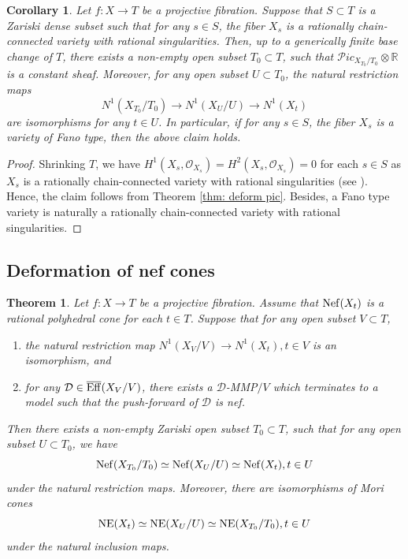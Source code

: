 \documentclass[11pt,oneside,reqno]{amsart}
\numberwithin{equation}{section}
\newtheorem{theorem}[proposition]{Theorem}
\newtheorem{corollary}[proposition]{Corollary}
\theoremstyle{definition}
\newcommand{\Nef}{{\rm {Nef}}}
\newcommand{\NE}{{\rm {NE}}}
\newcommand{\bEff}{\overline{\rm {Eff}}}
\newcommand{\bR}{\mathbb{R}}
\newcommand{\mD}{\mathcal{D}}
\newcommand{\mO}{\mathcal{O}}
\newcommand{\mP}{\mathcal{P}}
\begin{document}
\begin{corollary}\label{cor: FT and rationally connected}
Let $f: X \to T$ be a projective fibration. Suppose that $S\subset T$ is a Zariski dense subset such that for any $s\in S$, the fiber $X_s$ is a rationally chain-connected variety with rational singularities. Then, up to a generically finite base change of $T$, there  exists a non-empty open subset $T_0\subset T$, such that ${\mP}ic_{X_{T_0}/T_0} \otimes \bR$ is a constant sheaf. Moreover, for any open subset $U\subset T_0$, the natural restriction maps
\[
N^1(X_{T_0}/T_0) \to N^1(X_U/U) \to N^1(X_t)
\] are isomorphisms for any $t\in U$. In particular, if for any $s\in S$, the fiber $X_s$ is a variety of Fano type, then the above claim holds. 
\end{corollary}
\begin{proof}
Shrinking $T$, we have $H^1(X_s, \mO_{X_s})=H^2(X_s, \mO_{X_s})=0$ for each $s\in S$ as $X_s$ is a rationally chain-connected variety with rational singularities (see \cite[IV, Theorem 3.10, Corollary 3.8]{Kol96}). Hence, the claim follows from Theorem \ref{thm: deform pic}. Besides, a Fano type variety is naturally a rationally chain-connected variety with rational singularities.
\end{proof}




\subsection{Deformation of nef cones}\label{subsec: nef cone}


\begin{theorem}\label{thm: nef cone}
Let $f: X \to T$ be a projective fibration. Assume that $\Nef(X_t)$ is a rational polyhedral cone for each $t\in T$. Suppose that for any open subset $V\subset T$, 
\begin{enumerate}
\item the natural restriction map $N^1(X_V/V) \to N^1(X_t), t\in V$ is an isomorphism, and
\item for any $\mD \in \bEff(X_V/V)$, there exists a $\mD$-MMP$/V$ which terminates to a model such that the push-forward of $\mD$ is nef.
\end{enumerate}
Then there exists a non-empty Zariski open subset $T_0\subset T$, such that for any open subset $U\subset T_0$, we have
\[
\Nef(X_{T_0}/T_0) \simeq \Nef(X_U/U) \simeq \Nef(X_t), t\in U
\] under the natural restriction maps. Moreover, there are isomorphisms of Mori cones
\[
\NE(X_t) \simeq \NE(X_U/U) \simeq \NE(X_{T_0}/T_0), t\in U
\] under the natural inclusion maps.

\end{theorem}
\end{document}
